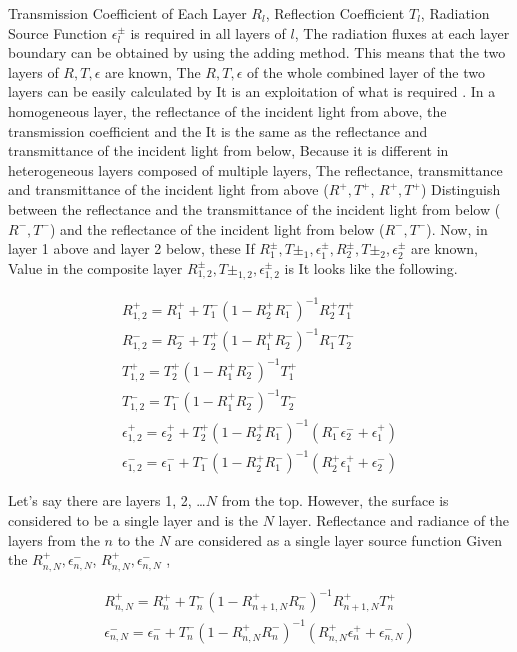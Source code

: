 Transmission Coefficient of Each Layer \(R_l\), Reflection Coefficient
\(T_l\), Radiation Source Function \(\epsilon^\pm_l\) is required in all
layers of \(l\), The radiation fluxes at each layer boundary can be
obtained by using the adding method. This means that the two layers of
\(R,T,\epsilon\) are known, The \(R,T,\epsilon\) of the whole combined
layer of the two layers can be easily calculated by It is an
exploitation of what is required . In a homogeneous layer, the
reflectance of the incident light from above, the transmission
coefficient and the It is the same as the reflectance and transmittance
of the incident light from below, Because it is different in
heterogeneous layers composed of multiple layers, The reflectance,
transmittance and transmittance of the incident light from above
(\(R^+, T^+\), \(R^+, T^+\)) Distinguish between the reflectance and the
transmittance of the incident light from below (\(R^-, T^-\)) and the
reflectance of the incident light from below (\(R^-, T^-\)). Now, in
layer 1 above and layer 2 below, these If
\(R^\pm_1, T\pm_1, \epsilon^\pm_1,  R^\pm_2, T\pm_2, \epsilon^\pm_2\)
are known, Value in the composite layer
\(R^\pm_{1,2}, T\pm_{1,2}, \epsilon^\pm_{1,2}\) is It looks like the
following.

\begin{eqnarray}
  R^+_{1,2}  =  R^+_1 + T^-_1 ( 1- R^+_2 R^-_1 )^{-1} R^+_2 T^+_1 \\
  R^-_{1,2}  =  R^-_2 + T^+_2 ( 1- R^+_1 R^-_2 )^{-1} R^-_1 T^-_2 \\
  T^+_{1,2}  =  T^+_2 ( 1- R^+_1 R^-_2 )^{-1} T^+_1 \\
  T^-_{1,2}  =  T^-_1 ( 1- R^+_1 R^-_2 )^{-1} T^-_2 \\
  \epsilon^+_{1,2}  =  \epsilon^+_2 
    + T^+_2 ( 1- R^+_2 R^-_1 )^{-1} ( R^-_1 \epsilon^-_2 + \epsilon^+_1 ) \\
  \epsilon^-_{1,2}  =  \epsilon^-_1 
    + T^-_1 ( 1- R^+_2 R^-_1 )^{-1} ( R^+_2 \epsilon^+_1 + \epsilon^-_2 ) 
\end{eqnarray}

Let's say there are layers 1, 2, \ldots{}\(N\) from the top. However,
the surface is considered to be a single layer and is the \(N\) layer.
Reflectance and radiance of the layers from the \(n\) to the \(N\) are
considered as a single layer source function Given the
\(R^+_{n,N}, \epsilon^-_{n,N}\), \(R^+_{n,N}, \epsilon^-_{n,N}\) ,

\begin{eqnarray}
  R^+_{n,N}  =  R^+_n 
      + T^-_n ( 1- R^+_{n+1,N} R^-_n )^{-1} R^+_{n+1,N} T^+_n \\
  \epsilon^-_{n,N}  =  \epsilon^-_n
    + T^-_n ( 1- R^+_{n,N} R^-_n )^{-1} 
      ( R^+_{n,N} \epsilon^+_n + \epsilon^-_{n,N} ) 
\end{eqnarray}

